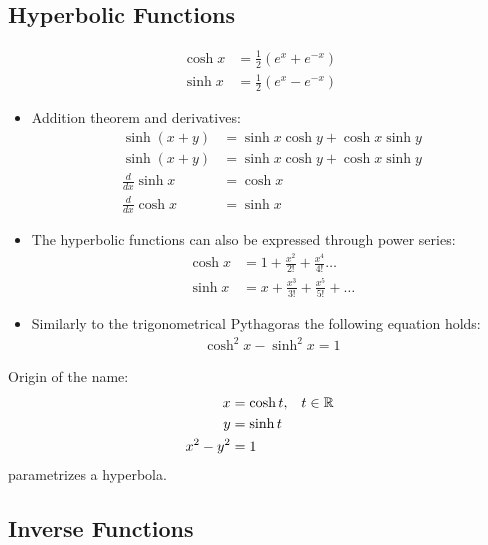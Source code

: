  \subsection{Hyperbolic Functions}
 \begin{df}
 \begin{align*}
 \cosh x & = \frac 1 2 \left(e^x +e^{-x} \right) \\
 \sinh x & = \frac 1 2 \left( e^x -e^{-x} \right)
 \end{align*}
 \end{df}
 \begin{pr} \mbox \\
 \begin{itemize}
 \item Addition theorem and derivatives:
 \begin{align*}
 \sinh (x+y)&  = \sinh x \cosh y + \cosh x \sinh y \\
 \sinh (x+y)&  = \sinh x \cosh y + \cosh x \sinh y \\
 \frac d {dx} \sinh x & = \cosh x \\
 \frac d {dx} \cosh x & = \sinh x
 \end{align*}
 
 \item
The hyperbolic functions can also be expressed through power series:
 \begin{align*}
 \cosh x & = 1 + \frac{x^2}{2!} + \frac{x^4}{4!} \dots \\
 \sinh x & = x + \frac{x^3}{3!} + \frac{x^5}{5!} + \dots
 \end{align*}
\item
 Similarly to the trigonometrical Pythagoras the following equation holds: 
 \begin{align*}
 \cosh^2 x - \sinh^2 x =1
 \end{align*}
 \end{itemize}
 \end{pr}

 
\begin{rk}
Origin of the name:
 \begin{align*}
 x & = \cosh t, & t \in \mathbb R \\
 y & = \sinh t \\
 x^2 -y^2 & = 1 
 \end{align*}
parametrizes a hyperbola. 
\end{rk}




\subsection{Inverse Functions}

